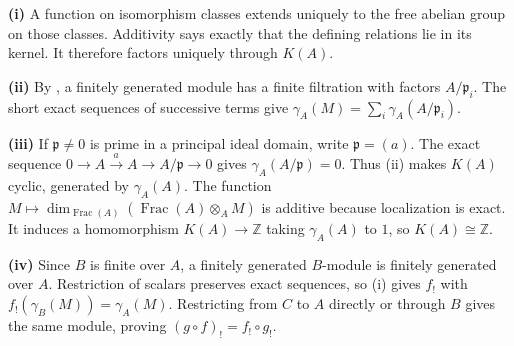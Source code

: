 \textbf{(i)} A function on isomorphism classes extends uniquely to the free abelian group on those classes. Additivity says exactly that the defining relations lie in its kernel. It therefore factors uniquely through $K(A)$.

\textbf{(ii)} By , a finitely generated module has a finite filtration with factors $A/\mathfrak{p}_i$. The short exact sequences of successive terms give $\gamma_A(M)=\sum_i\gamma_A(A/\mathfrak{p}_i)$.

\textbf{(iii)} If $\mathfrak{p}\ne0$ is prime in a principal ideal domain, write $\mathfrak{p}=(a)$. The exact sequence $0\to A\xrightarrow{a}A\to A/\mathfrak{p}\to0$ gives $\gamma_A(A/\mathfrak{p})=0$. Thus (ii) makes $K(A)$ cyclic, generated by $\gamma_A(A)$. The function $M\mapsto\dim_{\operatorname{Frac}(A)}(\operatorname{Frac}(A)\otimes_A M)$ is additive because localization is exact. It induces a homomorphism $K(A)\to\mathbb{Z}$ taking $\gamma_A(A)$ to $1$, so $K(A)\cong\mathbb{Z}$.

\textbf{(iv)} Since $B$ is finite over $A$, a finitely generated $B$-module is finitely generated over $A$. Restriction of scalars preserves exact sequences, so (i) gives $f_!$ with $f_!(\gamma_B(M))=\gamma_A(M)$. Restricting from $C$ to $A$ directly or through $B$ gives the same module, proving $(g\circ f)_!=f_!\circ g_!$.
